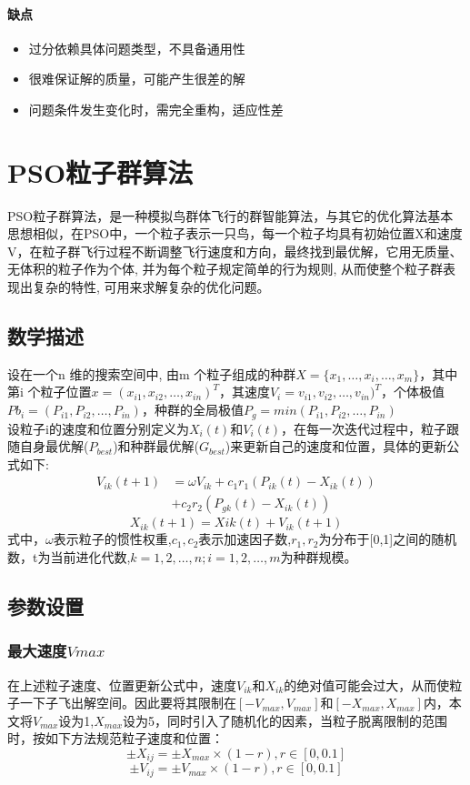 \documentclass[UTF8]{ctexart}
\begin{document}
\begin{multicols}{2}
\paragraph{缺点}
\begin{itemize}
	\item 过分依赖具体问题类型，不具备通用性
	\item 很难保证解的质量，可能产生很差的解
	\item 问题条件发生变化时，需完全重构，适应性差
\end{itemize}

\section{PSO粒子群算法}PSO粒子群算法，是一种模拟鸟群体飞行的群智能算法，与其它的优化算法基本思想相似，在PSO中，一个粒子表示一只鸟，每一个粒子均具有初始位置X和速度V，在粒子群飞行过程不断调整飞行速度和方向，最终找到最优解，它用无质量、无体积的粒子作为个体, 并为每个粒子规定简单的行为规则, 从而使整个粒子群表现出复杂的特性, 可用来求解复杂的优化问题。
\subsection{数学描述}
设在一个n 维的搜索空间中, 由m 个粒子组成的种群$X=\{x_1,\ldots,x_i,\ldots,x_m\}$，其中第i 个粒子位置$x=(x_{i1},x_{i2},\ldots,x_{in})^T$，其速度$V_i = v_{i1},v_{i2},\ldots,v_{in})^T$，个体极值$Pb_i=(P_{i1},P_{i2},\ldots,P_{in})$，种群的全局极值$P_g=min(P_{i1},P_{i2},\ldots,P_{in})$\\
\indent 设粒子i的速度和位置分别定义为$X_i(t)$和$V_i(t)$，在每一次迭代过程中，粒子跟随自身最优解($P_{best}$)和种群最优解($G_{best}$)来更新自己的速度和位置，具体的更新公式如下:
	\[\begin{aligned}V_{ik}(t+1) &= \omega V_{ik} + c_1r_1(P_{ik}(t)-X_{ik}(t)) \\&+ c_2r_2(P_{gk}(t) - X_{ik}(t))\end{aligned}\]
	\[X_{ik}(t+1)=X{ik}(t)+V_{ik}(t+1)\]
	式中，$\omega$表示粒子的惯性权重,$c_1,c_2$表示加速因子数,$r_1,r_2$为分布于[0,1]之间的随机数，t为当前进化代数,$k=1,2,\ldots,n;i = 1,2,\ldots,m$为种群规模。
\subsection{参数设置}
\subsubsection{最大速度$Vmax$}
在上述粒子速度、位置更新公式中，速度$V_{ik}$和$X_{ik}$的绝对值可能会过大，从而使粒子一下子飞出解空间。因此要将其限制在$[-V_{max},V_{max}]$和$[-X_{max},X_{max}]$内，本文将$V_{max}$设为1,$X_{max}$设为5，同时引入了随机化的因素，当粒子脱离限制的范围时，按如下方法规范粒子速度和位置：
	\[ \pm X_{ij} = \pm X_{max} \times(1-r),r\in[0, 0.1]\]
	\[ \pm V_{ij} = \pm V_{max} \times(1-r),r\in[0, 0.1]\]

\end{multicols}
\end{document}
